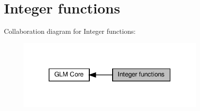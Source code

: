 \hypertarget{group__core__func__integer}{}\section{Integer functions}
\label{group__core__func__integer}
Collaboration diagram for Integer functions\+:\nopagebreak
\begin{figure}[H]
\begin{center}
\leavevmode
\includegraphics[width=267pt]{group__core__func__integer}
\end{center}
\end{figure}
